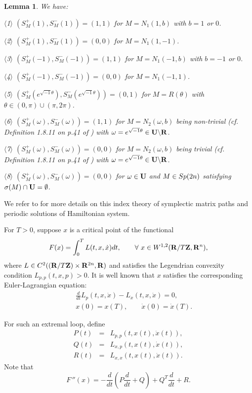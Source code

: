 \documentclass[11pt]{article}
\newtheorem{lemma}{Lemma}[section]
\def\be{\begin{equation}}
\def\ee{\end{equation}}
\def\bea{\begin{eqnarray}}
\def\eea{\end{eqnarray}}
\def\nn{\nonumber}
\def\lb{\label}
\def\R{{\bf R}}
\def\Z{{\bf Z}}
\def\U{{\bf U}}
\def\th{{\theta}}
\def\om{{\omega}}
\def\Sp{{\rm Sp}}
\begin{document}
\begin{lemma}\label{Lm:splitting.numbers}
We have:

$\langle$1$\rangle$ $(S_M^+(1),S_M^-(1))=(1,1)$ for $M=N_1(1,b)$ with $b=1$ or $0$.

$\langle$2$\rangle$ $(S_M^+(1),S_M^-(1))=(0,0)$ for $M=N_1(1,-1)$.

$\langle$3$\rangle$ $(S_M^+(-1),S_M^-(-1))=(1,1)$ for $M=N_1(-1,b)$ with $b=-1$ or $0$.

$\langle$4$\rangle$ $(S_M^+(-1),S_M^-(-1))=(0,0)$ for $M=N_1(-1,1)$.

$\langle$5$\rangle$ $(S_M^+(e^{\sqrt{-1}\th}),S_M^-(e^{\sqrt{-1}\th}))=(0,1)$
for $M=R(\theta)$ with $\th\in(0,\pi)\cup(\pi,2\pi)$.

$\langle$6$\rangle$ $(S_M^+(\om),S_M^-(\om))=(1,1)$ for $M=N_2(\om,b)$
being non-trivial (cf. Definition 1.8.11 on p.41 of \cite{Lon4}) with
$\om=e^{\sqrt{-1}\th}\in\U\backslash\R$.

$\langle$7$\rangle$ $(S_M^+(\om),S_M^-(\om))=(0,0)$ for $M=N_2(\om,b)$
being trivial (cf. Definition 1.8.11 on p.41 of \cite{Lon4}) with
$\om=e^{\sqrt{-1}\th}\in\U\backslash\R$.

$\langle$8$\rangle$ $(S_M^+(\om),S_M^-(\om))=(0,0)$ for $\om\in\U$ and $M\in\Sp(2n)$
satisfying $\sigma(M)\cap\U=\emptyset$.
\end{lemma}

\medskip

We refer to \cite{Lon4} for more details on this index theory of symplectic matrix paths
and periodic solutions of Hamiltonian system.

\medskip

For $T>0$, suppose $x$ is a critical point of the functional
$$ F(x)=\int_0^TL(t,x,\dot{x})dt,  \qquad \forall\,\, x\in W^{1,2}(\R/T\Z,\R^n), $$
where $L\in C^2((\R/T\Z)\times \R^{2n},\R)$ and satisfies the
Legendrian convexity condition $L_{p,p}(t,x,p)>0$. It is well known
that $x$ satisfies the corresponding Euler-Lagrangian
equation:
\bea
&& \frac{d}{dt}L_p(t,x,\dot{x})-L_x(t,x,\dot{x})=0,    \label{A2.7}\\
&& x(0)=x(T),  \qquad \dot{x}(0)=\dot{x}(T).    \label{A2.8}\eea

For such an extremal loop, define
\bea
P(t) &=& L_{p,p}(t,x(t),\dot{x}(t)),  \nn\\
Q(t) &=& L_{x,p}(t,x(t),\dot{x}(t)),  \nn\\
R(t) &=& L_{x,x}(t,x(t),\dot{x}(t)).  \nn\eea
Note that
\be F\,''(x)=-\frac{d}{dt}(P\frac{d}{dt}+Q)+Q^T\frac{d}{dt}+R. \lb{A2.9}\ee
\end{document}
